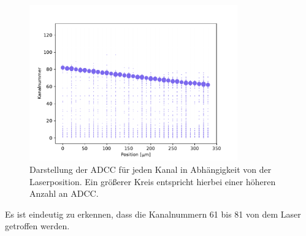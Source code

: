 \begin{figure}
  \centering
  \includegraphics[width=0.8\textwidth]{plots/Position_Kanal_Signal_Plot.pdf}
  \caption{Darstellung der ADCC für jeden Kanal in Abhängigkeit von der Laserposition. Ein größerer Kreis entspricht hierbei einer höheren Anzahl an ADCC.}
  \label{fig:Position}
\end{figure}
\FloatBarrier
Es ist eindeutig zu erkennen, dass die Kanalnummern 61 bis 81 von dem Laser getroffen werden.

